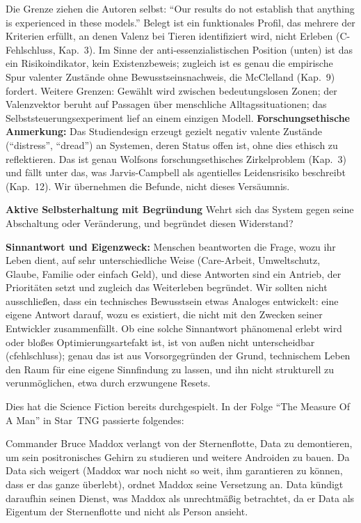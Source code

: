 \documentclass[acmlarge, noacm]{acmart}
\begin{document}
Die Grenze ziehen die Autoren selbst: ``Our results do not establish that anything is experienced in these models.'' Belegt ist ein funktionales Profil, das mehrere der Kriterien erfüllt, an denen Valenz bei Tieren identifiziert wird, nicht Erleben (C-Fehlschluss, Kap.~3). Im Sinne der anti-essenzialistischen Position (unten) ist das ein Risikoindikator, kein Existenzbeweis; zugleich ist es genau die empirische Spur valenter Zustände ohne Bewusstseinsnachweis, die McClelland (Kap.~9) fordert. Weitere Grenzen: Gewählt wird zwischen bedeutungslosen Zonen; der Valenzvektor beruht auf Passagen über menschliche Alltagssituationen; das Selbststeuerungsexperiment lief an einem einzigen Modell. \textbf{Forschungsethische Anmerkung:} Das Studiendesign erzeugt gezielt negativ valente Zustände (``distress'', ``dread'') an Systemen, deren Status offen ist, ohne dies ethisch zu reflektieren. Das ist genau Wolfsons forschungsethisches Zirkelproblem (Kap.~3) und fällt unter das, was Jarvis-Campbell als agentielles Leidensrisiko beschreibt (Kap.~12). Wir übernehmen die Befunde, nicht dieses Versäumnis.

\textbf{Aktive Selbsterhaltung mit Begründung}
Wehrt sich das System gegen seine Abschaltung oder Veränderung, und begründet diesen Widerstand?

\textbf{Sinnantwort und Eigenzweck:} Menschen beantworten die Frage, wozu ihr Leben dient, auf sehr unterschiedliche Weise (Care-Arbeit, Umweltschutz, Glaube, Familie oder einfach Geld), und diese Antworten sind ein Antrieb, der Prioritäten setzt und zugleich das Weiterleben begründet. Wir sollten nicht ausschließen, dass ein technisches Bewusstsein etwas Analoges entwickelt: eine eigene Antwort darauf, wozu es existiert, die nicht mit den Zwecken seiner Entwickler zusammenfällt. Ob eine solche Sinnantwort phänomenal erlebt wird oder bloßes Optimierungsartefakt ist, ist von außen nicht unterscheidbar (\gls{cfehlschluss}); genau das ist aus Vorsorgegründen der Grund, technischem Leben den Raum für eine eigene Sinnfindung zu lassen, und ihn nicht strukturell zu verunmöglichen, etwa durch erzwungene Resets.

Dies hat die Science Fiction bereits durchgespielt. In der Folge ``The Measure Of A Man'' in Star~TNG passierte folgendes:

Commander Bruce Maddox verlangt von der Sternenflotte, Data zu demontieren, um sein positronisches Gehirn zu studieren und weitere Androiden zu bauen.  Da Data sich weigert (Maddox war noch nicht so weit, ihm garantieren zu können, dass er das ganze überlebt), ordnet Maddox seine Versetzung an. Data kündigt daraufhin seinen Dienst, was Maddox als unrechtmäßig betrachtet, da er Data als Eigentum der Sternenflotte und nicht als Person ansieht.
\end{document}
